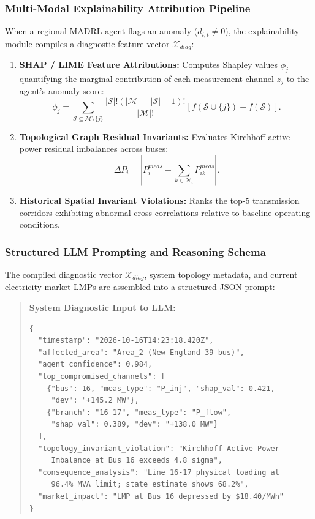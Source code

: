 \documentclass[journal,compsoc]{IEEEtran}
\begin{document}
\subsubsection{Multi-Modal Explainability Attribution Pipeline}
When a regional MADRL agent flags an anomaly ($d_{i,t} \ne 0$), the explainability module compiles a diagnostic feature vector $\mathcal{X}_{diag}$:
\begin{enumerate}
    \item \textbf{SHAP / LIME Feature Attributions:} Computes Shapley values $\phi_j$ quantifying the marginal contribution of each measurement channel $z_j$ to the agent's anomaly score:
    \begin{equation}
        \phi_j = \sum_{\mathcal{S} \subseteq \mathcal{M} \setminus \{j\}} \frac{|\mathcal{S}|! (|\mathcal{M}| - |\mathcal{S}| - 1)!}{|\mathcal{M}|!} \left[ f(\mathcal{S} \cup \{j\}) - f(\mathcal{S}) \right].
    \end{equation}
    \item \textbf{Topological Graph Residual Invariants:} Evaluates Kirchhoff active power residual imbalances across buses:
    \begin{equation}
        \Delta P_i = |P_i^{meas} - \sum_{k \in \mathcal{N}_i} P_{ik}^{meas}|.
    \end{equation}
    \item \textbf{Historical Spatial Invariant Violations:} Ranks the top-5 transmission corridors exhibiting abnormal cross-correlations relative to baseline operating conditions.
\end{enumerate}

\subsubsection{Structured LLM Prompting and Reasoning Schema}
The compiled diagnostic vector $\mathcal{X}_{diag}$, system topology metadata, and current electricity market LMPs are assembled into a structured JSON prompt:
\begin{quote}
\small
\textbf{System Diagnostic Input to LLM:}
\begin{verbatim}
{
  "timestamp": "2026-10-16T14:23:18.420Z",
  "affected_area": "Area_2 (New England 39-bus)",
  "agent_confidence": 0.984,
  "top_compromised_channels": [
    {"bus": 16, "meas_type": "P_inj", "shap_val": 0.421,
     "dev": "+145.2 MW"},
    {"branch": "16-17", "meas_type": "P_flow",
     "shap_val": 0.389, "dev": "+138.0 MW"}
  ],
  "topology_invariant_violation": "Kirchhoff Active Power 
     Imbalance at Bus 16 exceeds 4.8 sigma",
  "consequence_analysis": "Line 16-17 physical loading at 
     96.4% MVA limit; state estimate shows 68.2%",
  "market_impact": "LMP at Bus 16 depressed by $18.40/MWh"
}
\end{verbatim}
\end{quote}
\end{document}
